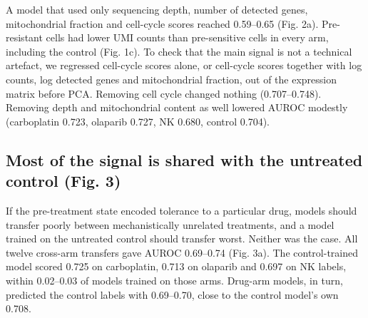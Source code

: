 \documentclass[11pt,a4paper]{article}
\begin{document}
A model that used only sequencing depth, number of detected genes, mitochondrial fraction and cell-cycle scores reached 0.59--0.65 (Fig. 2a). Pre-resistant cells had lower UMI counts than pre-sensitive cells in every arm, including the control (Fig. 1c). To check that the main signal is not a technical artefact, we regressed cell-cycle scores alone, or cell-cycle scores together with log counts, log detected genes and mitochondrial fraction, out of the expression matrix before PCA. Removing cell cycle changed nothing (0.707--0.748). Removing depth and mitochondrial content as well lowered AUROC modestly (carboplatin 0.723, olaparib 0.727, NK 0.680, control 0.704).

\subsection*{Most of the signal is shared with the untreated control (Fig. 3)}

If the pre-treatment state encoded tolerance to a particular drug, models should transfer poorly between mechanistically unrelated treatments, and a model trained on the untreated control should transfer worst. Neither was the case. All twelve cross-arm transfers gave AUROC 0.69--0.74 (Fig. 3a). The control-trained model scored 0.725 on carboplatin, 0.713 on olaparib and 0.697 on NK labels, within 0.02--0.03 of models trained on those arms. Drug-arm models, in turn, predicted the control labels with 0.69--0.70, close to the control model's own 0.708.
\end{document}
